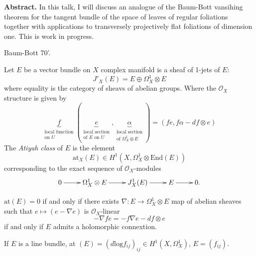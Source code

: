 \medskip\noindent
{\bf Abstract.}
In this talk, I will discuss an analogue of
the Baum-Bott vansihing theorem for
the tangent bundle of the space of leaves of
regular foliations together with
applications to transversely projectively
flat foliations of dimension one. This
is work in progress.

\medskip\noindent



Baum-Bott 70'.

Let $E$ be a vector bundle on $X$
complex manifold is a sheaf of 1-jets of $E$:
$$
J'_X(E)= E \oplus \Omega^1_X \otimes E
$$
where equality is the category of sheavs of
abelian groups.
Where the $\mathcal{O}_X$ structure is given
by
$$
\underbrace{f}_{\substack{\text{local
function} \\ \text{on }U}}
(\underbrace{e}_{\substack{\text{local
section} \\ \text{of $E$ on  $U$}}}
, \underbrace{\alpha}_{\substack{\text{local
section} \\
\text{of $\Omega^1_X \otimes E$}}})
=(fe,f\alpha-df \otimes e)
$$
The {\it Atiyah class} of $E$ is the element
$$
\text{at}_X(E) \in H^1(X,\Omega_X^1 \otimes
\text{End}(E))
$$
corresponding to the exact sequence of
$\mathcal{O}_X$-modules
$$
\xymatrix{
0\ar[r]&\Omega_X^1\otimes
E\ar[r]&J_X^1(E)\ar[r]&E\ar[r]&0.
}
$$

\begin{remark}
\label{remark-holomorphic-connection}
 $\text{at}(E)=0$ if and only if there exists
$\nabla:E \to \Omega^1_X \otimes E$ map of
abelian sheaves
such that $e \mapsto  (e-\nabla e)$ is
$\mathcal{O}_X$-linear
$$
-\nabla fe=-f\nabla e - df \otimes e
$$
if and only if $E$ admits a holomorphic
connextion.
\end{remark}

\begin{example}
\label{example-line-bundl-holom-conne}
If $E$ is a line bundle, at
$(E)=(d\text{log}f_{ij})_{ij}
\in H^1(X,\Omega_X^1)$, $E=(f_{ij})$.
\end{example}

